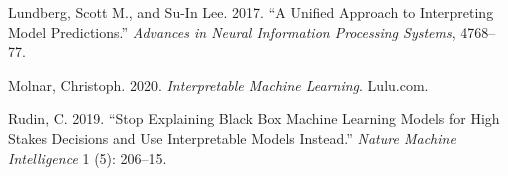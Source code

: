 \documentclass[
  letterpaper,
  DIV=11,
  numbers=noendperiod]{scrartcl}
\newlength{\cslhangindent}
\newlength{\cslentryspacingunit} %
\newenvironment{CSLReferences}[2] %
 {%
  \setlength{\parindent}{0pt}
  \ifodd #1
  \let\oldpar\par
  \def\par{\hangindent=\cslhangindent\oldpar}
  \fi
  \setlength{\parskip}{#2\cslentryspacingunit}
 }%
 {}
\begin{document}
\begin{CSLReferences}{1}{0}
\leavevmode{}%
Lundberg, Scott M., and Su-In Lee. 2017. {``A Unified Approach to
Interpreting Model Predictions.''} \emph{Advances in Neural Information
Processing Systems}, 4768--77.

\leavevmode{}%
Molnar, Christoph. 2020. \emph{Interpretable Machine Learning}.
Lulu.com.

\leavevmode{}%
Rudin, C. 2019. {``Stop Explaining Black Box Machine Learning Models for
High Stakes Decisions and Use Interpretable Models Instead.''}
\emph{Nature Machine Intelligence} 1 (5): 206--15.

\end{CSLReferences}
\end{document}
